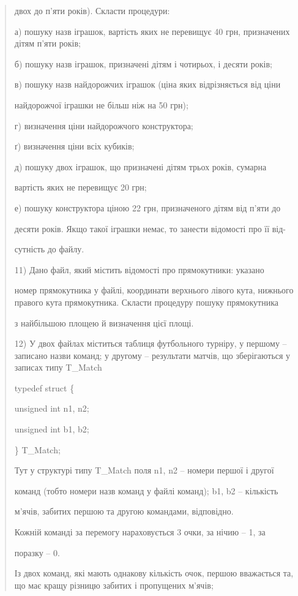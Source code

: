 \documentclass[]{article}
\begin{document}
\begin{quote}
двох до п'яти років). Скласти процедури:

а) пошуку назв іграшок, вартість яких не перевищує 40 грн, призначених
дітям п'яти років;

б) пошуку назв іграшок, призначені дітям і чотирьох, і десяти років;

в) пошуку назв найдорожчих іграшок (ціна яких відрізняється від ціни

найдорожчої іграшки не більш ніж на 50 грн);

г) визначення ціни найдорожчого конструктора;

ґ) визначення ціни всіх кубиків;

д) пошуку двох іграшок, що призначені дітям трьох років, сумарна

вартість яких не перевищує 20 грн;

е) пошуку конструктора ціною 22 грн, призначеного дітям від п'яти до

десяти років. Якщо такої іграшки немає, то занести відомості про її від-

сутність до файлу.

11) Дано файл, який містить відомості про прямокутники: указано

номер прямокутника у файлі, координати верхнього лівого кута, нижнього
правого кута прямокутника. Скласти процедуру пошуку прямокутника

з найбільшою площею й визначення цієї площі.

12) \protect\hypertarget{_Hlk65238015}{}{}У двох файлах міститься
таблиця футбольного турніру, у першому -- записано назви команд; у
другому -- результати матчів, що зберігаються у записах типу T\_Match

typedef struct \{

unsigned int n1, n2;

unsigned int b1, b2;

\} T\_Match;

Тут у структурі типу T\_Match поля n1, n2 -- номери першої і другої

команд (тобто номери назв команд у файлі команд); b1, b2 -- кількість

м'ячів, забитих першою та другою командами, відповідно.

Кожній команді за перемогу нараховується 3 очки, за нічию -- 1, за

поразку -- 0.

Із двох команд, які мають однакову кількість очок, першою вважається та,
що має кращу різницю забитих і пропущених м'ячів;


\end{quote}
\end{document}
